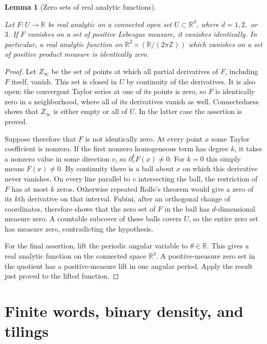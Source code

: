 \documentclass[11pt]{amsart}
\newcommand{\R}{\mathbb R}
\newcommand{\Z}{\mathbb Z}
\newtheorem{lemma}[theorem]{Lemma}
\theoremstyle{definition}
\theoremstyle{remark}
\numberwithin{equation}{section}
\providecommand{\lean}[1]{}
\providecommand{\leanok}{}
\begin{document}
\begin{lemma}[Zero sets of real analytic functions]
\label{ext:analytic-zero}
\lean{Auto.ext_analytic_zero,Auto.ext_analytic_zero_config}
\leanok
Let $F:U\to\R$ be real analytic on a connected open set
$U\subset\R^d$, where $d=1,2,$ or $3$.  If $F$ vanishes
on a set of positive Lebesgue measure, it vanishes identically.
In particular, a real analytic function on
$\R^2\times(\R/(2\pi\Z))$ which vanishes on a set of positive
product measure is identically zero.
\end{lemma}
\begin{proof}
Let $Z_\infty$ be the set of points at which all partial
derivatives of $F$, including $F$ itself, vanish.  This set
is closed in $U$ by continuity of the derivatives.  It is
also open: the convergent Taylor series at one of its points
is zero, so $F$ is identically zero in a neighborhood, where
all of its derivatives vanish as well.  Connectedness shows
that $Z_\infty$ is either empty or all of $U$.  In the latter
case the assertion is proved.

Suppose therefore that $F$ is not identically zero.  At
every point $x$ some Taylor coefficient is nonzero.  If the
first nonzero homogeneous term has degree $k$, it takes a
nonzero value in some direction $v$, so
$\partial_v^kF(x)\ne0$.  For $k=0$ this simply means
$F(x)\ne0$.  By continuity there is a ball about $x$ on
which this derivative never vanishes.  On every line
parallel to $v$ intersecting the ball, the restriction of
$F$ has at most $k$ zeros.  Otherwise repeated Rolle's
theorem would give a zero of its $k$th derivative on that
interval.  Fubini, after an orthogonal change of coordinates,
therefore shows that the zero set of $F$ in the ball has
$d$-dimensional measure zero.  A countable subcover of these
balls covers $U$, so the entire zero set has measure zero,
contradicting the hypothesis.

For the final assertion, lift the periodic angular variable
to $\theta\in\R$.  This gives a real analytic function on
the connected space $\R^3$.  A positive-measure zero set in
the quotient has a positive-measure lift in one angular
period.  Apply the result just proved to the lifted function.
\end{proof}


\section{Finite words, binary density, and tilings}\label{sec:comb-prelim}
\end{document}
